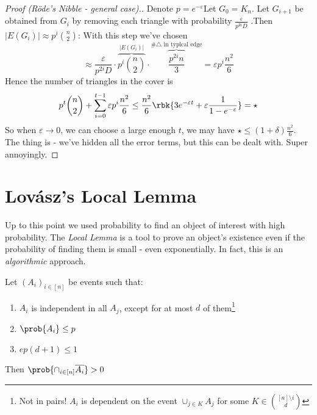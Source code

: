 \documentclass[a4paper, 11pt, oneside]{book}
\begin{document}
\begin{proof}
	[Proof (R\"ode's Nibble - general case).] Denote $p = e^{-\varepsilon}$Let $G_0 = K_n$. Let $G_{i+1}$ be obtained from $G_i$ by removing each triangle with probability $\frac{\varepsilon}{p^{2i}D}$ .Then $|E(G_i)| \approx p^i{n\choose 2}$: With this step we've chosen $$\approx \frac{\varepsilon}{p^{2i}D}\cdot \overbrace{p^i{n\choose 2}}^{|E(G_i)|}\cdot  \overbrace{\frac{p^{2i}n}{3}}^{\text{\# $\triangle$ in typical edge}} = \varepsilon p^i\frac{n^2}{6}$$
	Hence the number of triangles in the cover is
	\[
	p^t{n\choose 2} + \sum_{i=0}^{t-1}\varepsilon p^i\frac{n^2}{6} \le \frac{n^2}{6}\rbk{3e^{-\varepsilon t} + \varepsilon\frac{1}{1-e^{-\varepsilon}}} = \star
	\]
	So when $\varepsilon\to 0$, we can choose a large enough $t$, we may have $\star \le (1+\delta)\frac{n^2}{6}$. The thing is - we've hidden all the error terms, but this can be dealt with. Super annoyingly.
\end{proof}

\chapter{Lov\'asz's Local Lemma}
Up to this point we used probability to find an object of interest with high probability.  The \emph{Local Lemma} is a tool to prove an object's existence even if the probability of finding them is small - even exponentially. In fact, this is an \emph{algorithmic} approach.
\begin{yellowBox}
\begin{lemma}
	\label{Local Lemma} Let $(A_i)_{i\in [n]}$ be events such that:
	\begin{enumerate}
  \item  $A_i$ is independent in all $A_j$, except for at most $d$ of them\footnote{Not in pairs! $A_i$ is dependent on the event $\cup_{j\in K} A_j$ for some $K\in {[n]\setminus i\choose d}$}
	\item $\prob{A_i} \le p$
	\item $ep(d+1)\le 1$
\end{enumerate}
Then $\prob{\cap_{i\in [n]}\overline{A_i}} > 0$
\end{lemma}	
\end{yellowBox}
\end{document}
